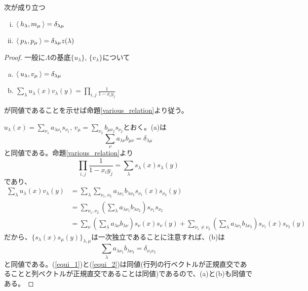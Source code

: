 \documentclass{ltjsreport}
\begin{document}
\begin{prop}\label{inner_prod}
  次が成り立つ
  \begin{enumerate}[(i)]
    \item $\langle\:h_\lambda,m_\mu\:\rangle=\delta_{\lambda\mu}$
    \item $\langle\:p_\lambda,p_\mu\:\rangle=\delta_{\lambda\mu}z(\lambda)$
  \end{enumerate}
\end{prop}

\begin{proof}
  一般に$\Lambda$の基底$\{u_\lambda\}$, $\{v_\lambda\}$について
  \begin{enumerate}[(a)]
    \item $\langle\:u_\lambda,v_\mu\:\rangle=\delta_{\lambda\mu}$
    \item $\sum_{\lambda}u_\lambda(x) v_\lambda(y)=\prod_{i,j}\frac{1}{1-x_iy_j}$
  \end{enumerate}
  が同値であることを示せば命題\ref{various_relation}より従う。

  $u_\lambda(x)=\sum_{\nu_1}a_{\lambda\nu_1}s_{\nu_1}$, $v_\mu=\sum_{\nu_2}b_{\mu\nu_2}s_{\nu_2}$とおく。(a)は
  \begin{equation}\label{equi_1}
    \sum_{\nu}a_{\lambda\nu}b_{\mu\nu}=\delta_{\lambda\mu}
  \end{equation}
  と同値である。命題\ref{various_relation}より
  \[
  \prod_{i,j}\frac{1}{1-x_iy_j}=\sum_{\lambda}s_\lambda(x)s_\lambda(y)  
  \]
  であり、
  \begin{align*}
    \sum_{\lambda}u_\lambda(x)v_\lambda(y)
    &=\sum_{\lambda}\sum_{\nu_1,\nu_2}a_{\lambda\nu_1}b_{\lambda\nu_2}s_{\nu_1}(x)s_{\nu_2}(y)\\
    &=\sum_{\nu_1,\nu_2}\left(\sum_{\lambda}a_{\lambda\nu_1}b_{\lambda\nu_2}\right)s_{\nu_1}s_{\nu_2}\\
    &=\sum_{\nu}\left(\sum_{\lambda}a_{\lambda\nu}b_{\lambda\nu}\right)s_\nu(x)s_\nu(y)
    +\sum_{\nu_1\neq\nu_2}\left(\sum_{\lambda}a_{\lambda\nu_1}b_{\lambda\nu_2}\right)s_{\nu_1}(x)s_{\nu_2}(y)
  \end{align*}
  だから、$\{s_\lambda(x)s_\mu(y)\}_{\lambda,\mu}$は一次独立であることに注意すれば、(b)は
  \begin{equation}\label{equi_2}
    \sum_{\lambda}a_{\lambda\nu_1}b_{\lambda\nu_2}=\delta_{\nu_1\nu_2}  
  \end{equation}
  と同値である。(\ref{equi_1})と(\ref{equi_2})は同値(行列の行ベクトルが正規直交であることと列ベクトルが正規直交であることは同値)であるので、(a)と(b)も同値である。
\end{proof}
\end{document}
